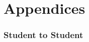 \part{Appendices}
\appendix
{}%
\captionsetup{list=no}%

\clearpage
\section{Student to Student}
% 
 